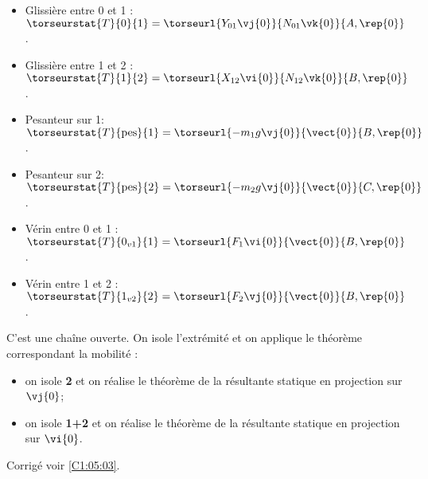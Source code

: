 \ifprof
\begin{itemize}
\item Glissière entre 0 et 1 : $\torseurstat{T}{0}{1}=\torseurl{Y_{01}\vj{0}}{N_{01}\vk{0}}{A,\rep{0}}$.
\item Glissière entre 1 et 2 : $\torseurstat{T}{1}{2}=\torseurl{X_{12}\vi{0}}{N_{12}\vk{0}}{B,\rep{0}}$.
\item Pesanteur sur 1: $\torseurstat{T}{\text{pes}}{1}=\torseurl{-m_1g\vj{0}}{\vect{0}}{B,\rep{0}}$.
\item Pesanteur sur 2: $\torseurstat{T}{\text{pes}}{2}=\torseurl{-m_2g\vj{0}}{\vect{0}}{C,\rep{0}}$.
\item Vérin entre 0 et 1 : $\torseurstat{T}{0_{v1}}{1}=\torseurl{F_1\vi{0}}{\vect{0}}{B,\rep{0}}$.
\item Vérin entre 1 et 2 : $\torseurstat{T}{1_{v2}}{2}=\torseurl{F_2\vj{0}}{\vect{0}}{B,\rep{0}}$.
\end{itemize}\else
\fi

\ifprof
C'est une chaîne ouverte. On isole l'extrémité et on applique le théorème correspondant la mobilité : 
\begin{itemize}
\item on isole \textbf{2} et on réalise le théorème de la résultante statique en projection sur $\vj{0}$;
\item on isole \textbf{1+2} et on réalise le théorème de la résultante statique en projection sur $\vi{0}$.
\end{itemize}
\else
\fi


\ifprof
\else
\begin{flushright}
\footnotesize{Corrigé  voir \ref{C1:05:03}.}
\end{flushright}%
\fi